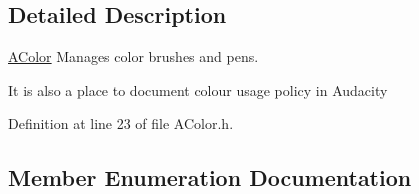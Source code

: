 \subsection{Detailed Description}
\hyperlink{class_a_color}{A\+Color} Manages color brushes and pens. 

It is also a place to document colour usage policy in Audacity 

Definition at line 23 of file A\+Color.\+h.



\subsection{Member Enumeration Documentation}
